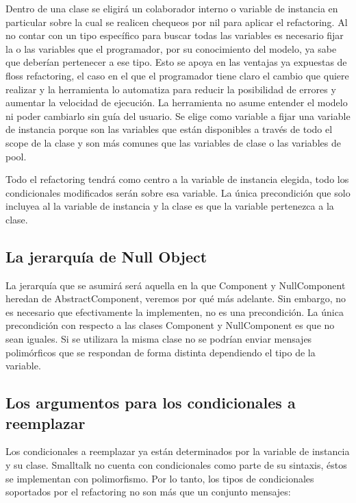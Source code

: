 Dentro de una clase se eligirá un colaborador interno o variable de instancia en particular sobre la
cual se realicen chequeos por nil para aplicar el refactoring. Al no contar con un tipo específico
para buscar todas las variables es necesario fijar la o las variables que el programador, por su
conocimiento del modelo, ya sabe que deberían pertenecer a ese tipo. Esto se apoya en las ventajas
ya expuestas de floss refactoring, el caso en el que el programador tiene claro el cambio que quiere
realizar y la herramienta lo automatiza para reducir la posibilidad de errores y aumentar la
velocidad de ejecución. La herramienta no asume entender el modelo ni poder cambiarlo sin guía del
usuario. Se elige como variable a fijar una variable de instancia porque son las variables que están
disponibles a través de todo el scope de la clase y son más comunes que las variables de clase o
las variables de pool.

Todo el refactoring tendrá como centro a la variable de instancia elegida, todo los condicionales
modificados serán sobre esa variable. La única precondición que solo incluyea al la variable de
instancia y la clase es que la variable pertenezca a la clase.

\subsection*{La jerarquía de Null Object}

La jerarquía que se asumirá será aquella en la que Component y NullComponent heredan de
AbstractComponent, veremos por qué más adelante. Sin embargo, no es necesario que efectivamente la
implementen, no es una precondición. La única precondición con respecto a las clases Component y
NullComponent es que no sean iguales. Si se utilizara la misma clase no se podrían enviar mensajes
polimórficos que se respondan de forma distinta dependiendo el tipo de la variable.

\subsection*{Los argumentos para los condicionales a reemplazar}

Los condicionales a reemplazar ya están determinados por la variable de instancia y su clase. Smalltalk no
cuenta con condicionales como parte de su sintaxis, éstos se implementan con polimorfismo. Por lo tanto,
los tipos de condicionales soportados por el refactoring no son más que un conjunto mensajes:

